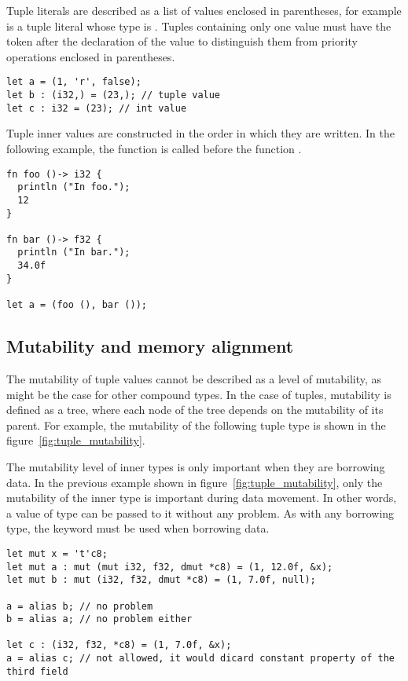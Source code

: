Tuple literals are described as a list of values enclosed in parentheses, for
example  is a tuple literal whose type is . Tuples containing only one value must have the token \token{,}
after the declaration of the value to distinguish them from priority operations
enclosed in parentheses.

\begin{lstlisting}[style=coloredverbatim]
let a = (1, 'r', false);
let b : (i32,) = (23,); // tuple value
let c : i32 = (23); // int value
\end{lstlisting}

\noindent Tuple inner values are constructed in the order in which they are
written. In the following example, the function  is called before
the function .

\begin{lstlisting}[style=coloredverbatim]
fn foo ()-> i32 {
  println ("In foo.");
  12
}

fn bar ()-> f32 {
  println ("In bar.");
  34.0f
}

let a = (foo (), bar ());
\end{lstlisting}

\subsection {Mutability and memory alignment}%
\label{sec:tuple_mutability}

The mutability of tuple values cannot be described as a level of mutability, as
might be the case for other compound types. In the case of tuples, mutability is
defined as a tree, where each node of the tree depends on the mutability of its
parent. For example, the mutability of the following tuple type  is shown in the figure~\ref{fig:tuple_mutability}.



The mutability level of inner types is only important when they are borrowing
data. In the previous example shown in figure~\ref{fig:tuple_mutability}, only
the mutability of the inner type  is important during data movement.
In other words, a value of type  can be passed
to it without any problem. As with any borrowing type, the keyword
 must be used when borrowing data.

\begin{lstlisting}[style=coloredverbatim]
let mut x = 't'c8;
let mut a : mut (mut i32, f32, dmut *c8) = (1, 12.0f, &x);
let mut b : mut (i32, f32, dmut *c8) = (1, 7.0f, null);

a = alias b; // no problem
b = alias a; // no problem either

let c : (i32, f32, *c8) = (1, 7.0f, &x);
a = alias c; // not allowed, it would dicard constant property of the third field
\end{lstlisting}

